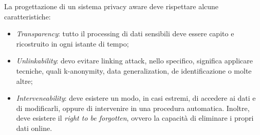 La progettazione di un sistema privacy aware deve rispettare alcune 
caratteristiche: 
\begin{itemize}
    \item \emph{Transparency}: tutto il processing di dati sensibili deve essere
    capito e ricostruito in ogni istante di tempo;
    \item \emph{Unlinkability}: devo evitare linking attack, nello specifico, significa 
    applicare tecniche, quali k-anonymity, data generalization, de identificazione o molte altre;
    \item \emph{Interveneability}: deve esistere un modo, in casi estremi, di accedere ai dati e 
    di modificarli, oppure di intervenire in una procedura automatica. 
    Inoltre, deve esistere il \emph{right to be forgotten}, ovvero 
    la capacità di eliminare i propri dati online.
\end{itemize}